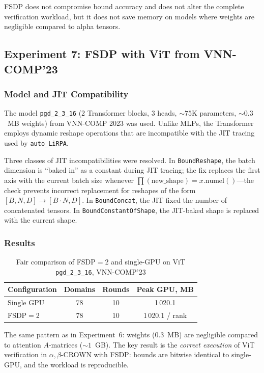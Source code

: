 FSDP does not compromise bound accuracy and does not alter the complete
verification workload, but it does not save memory on models where weights
are negligible compared to alpha tensors.

\subsection{Experiment 7: FSDP with ViT from VNN-COMP'23}
\label{sec:exp7}

\subsubsection{Model and JIT Compatibility}

The model \texttt{pgd\_2\_3\_16} (2 Transformer blocks, 3 heads,
${\sim}75$K parameters, ${\sim}0.3$~MB weights) from VNN-COMP 2023 was used.
Unlike MLPs, the Transformer employs dynamic reshape operations that are
incompatible with the JIT tracing used by \texttt{auto\_LiRPA}.

Three classes of JIT incompatibilities were resolved. In \texttt{BoundReshape},
the batch dimension is ``baked in'' as a constant during JIT tracing; the fix
replaces the first axis with the current batch size whenever
$\prod(\text{new\_shape}) = x.\text{numel}()$---the check prevents incorrect
replacement for reshapes of the form $[B, N, D] \to [B \cdot N, D]$.
In \texttt{BoundConcat}, the JIT fixed the number of concatenated tensors.
In \texttt{BoundConstantOfShape}, the JIT-baked shape is replaced with the
current shape.

\subsubsection{Results}

\begin{table}[htbp]
\centering
\caption{Fair comparison of FSDP$=$2 and single-GPU on ViT
\texttt{pgd\_2\_3\_16}, VNN-COMP'23}
\label{tab:fsdp-vit}
\begin{tabular}{lccc}
\toprule
Configuration & Domains & Rounds & Peak GPU, MB \\
\midrule
Single GPU & 78 & 10 & 1\,020.1 \\
FSDP$=$2   & 78 & 10 & 1\,020.1 / rank \\
\bottomrule
\end{tabular}
\end{table}

The same pattern as in Experiment~6: weights ($0.3$~MB) are negligible compared
to attention $A$-matrices (${\sim}1$~GB). The key result is the \textit{correct
execution} of ViT verification in $\alpha,\beta$-CROWN with FSDP: bounds are
bitwise identical to single-GPU, and the workload is reproducible.

